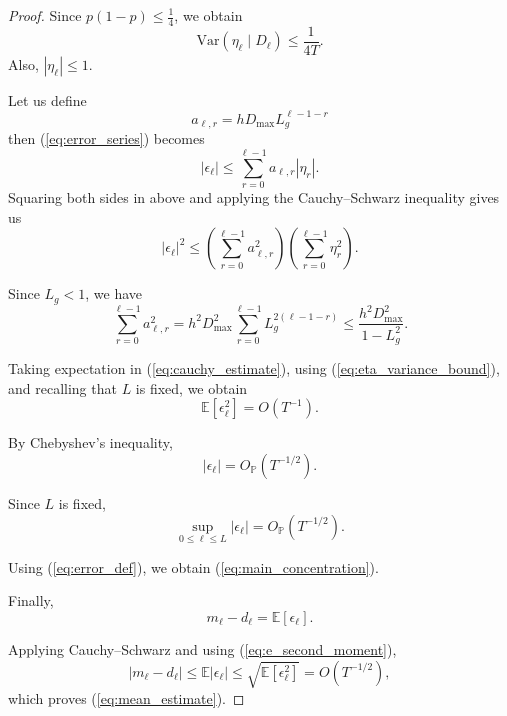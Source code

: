 \documentclass[10pt]{iopart}
\newcommand{\1}{\mathbf{1}}
\begin{document}
\begin{proof}
Since $p(1-p)\le \frac14$, we obtain
\begin{equation}
\mathrm{Var}(\eta_\ell\mid D_\ell)
\le
\frac1{4T}.
\label{eq:eta_variance_bound}
\end{equation}
%
Also, $|\eta_\ell|\le1$.


Let us define
%
\begin{equation}
a_{\ell,r}
=
hD_{\max}L_g^{\ell-1-r}
\label{eq:a_def}
\end{equation}
%
then (\ref{eq:error_series}) becomes
\begin{equation}
|\epsilon_\ell|
\le
\sum_{r=0}^{\ell-1}
a_{\ell,r}|\eta_r|.
\label{eq:error_series2}
\end{equation}
%
Squaring both sides in above and applying the Cauchy--Schwarz inequality  gives us
%
\begin{equation}
|\epsilon_\ell|^2
\le
\left(
\sum_{r=0}^{\ell-1}a_{\ell,r}^2
\right)
\left(
\sum_{r=0}^{\ell-1}\eta_r^2
\right).
\label{eq:cauchy_estimate}
\end{equation}

Since $L_g<1$, we have 
\begin{equation}
\sum_{r=0}^{\ell-1}a_{\ell,r}^2
=
h^2D_{\max}^2
\sum_{r=0}^{\ell-1}
L_g^{2(\ell-1-r)}
\le
\frac{h^2D_{\max}^2}{1-L_g^2}.
\label{eq:geometric_bound}
\end{equation}

Taking expectation in (\ref{eq:cauchy_estimate}), using (\ref{eq:eta_variance_bound}), and recalling that $L$ is fixed, we obtain
\begin{equation}
\mathbb E[\epsilon_\ell^2]
=
O(T^{-1}).
\label{eq:e_second_moment}
\end{equation}

By Chebyshev's inequality,
\begin{equation}
\vert\epsilon_\ell\vert
=
O_{\mathbb P}(T^{-1/2}).
\label{eq:e_op}
\end{equation}

Since $L$ is fixed,
\begin{equation}
\sup_{0\le \ell\le L}|\epsilon_\ell|
=
O_{\mathbb P}(T^{-1/2}).
\label{eq:sup_e}
\end{equation}

Using (\ref{eq:error_def}), we obtain (\ref{eq:main_concentration}).

Finally,
\begin{equation}
m_\ell-d_\ell
=
\mathbb E[\epsilon_\ell].
\label{eq:m_minus_d}
\end{equation}

Applying Cauchy--Schwarz and using (\ref{eq:e_second_moment}),
\begin{equation}
|m_\ell-d_\ell|
\le
\mathbb E|\epsilon_\ell|
\le
\sqrt{\mathbb E[\epsilon_\ell^2]}
=
O(T^{-1/2}),
\label{eq:mean_bound_final}
\end{equation}
which proves (\ref{eq:mean_estimate}).
\end{proof}
\end{document}
